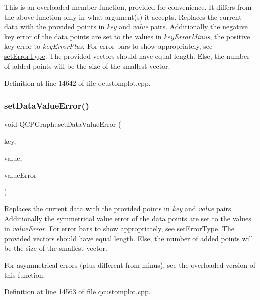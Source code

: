 This is an overloaded member function, provided for convenience. It differs from the above function only in what argument(s) it accepts. Replaces the current data with the provided points in {\itshape key} and {\itshape value} pairs. Additionally the negative key error of the data points are set to the values in {\itshape key\+Error\+Minus}, the positive key error to {\itshape key\+Error\+Plus}. For error bars to show appropriately, see \hyperlink{class_q_c_p_graph_ac3614d799c3894f2bc646e99c7f73d38}{set\+Error\+Type}. The provided vectors should have equal length. Else, the number of added points will be the size of the smallest vector. 

Definition at line 14642 of file qcustomplot.\+cpp.

\mbox{\label{class_q_c_p_graph_acba6296eadcb36b93267628b8dae3de5}} 
\subsubsection{\texorpdfstring{set\+Data\+Value\+Error()}{setDataValueError()}\hspace{0.1cm}{\footnotesize\ttfamily [1/2]}}
{\footnotesize\ttfamily void Q\+C\+P\+Graph\+::set\+Data\+Value\+Error (\begin{DoxyParamCaption}\item[{const Q\+Vector$<$ double $>$ \&}]{key,  }\item[{const Q\+Vector$<$ double $>$ \&}]{value,  }\item[{const Q\+Vector$<$ double $>$ \&}]{value\+Error }\end{DoxyParamCaption})}

Replaces the current data with the provided points in {\itshape key} and {\itshape value} pairs. Additionally the symmetrical value error of the data points are set to the values in {\itshape value\+Error}. For error bars to show appropriately, see \hyperlink{class_q_c_p_graph_ac3614d799c3894f2bc646e99c7f73d38}{set\+Error\+Type}. The provided vectors should have equal length. Else, the number of added points will be the size of the smallest vector.

For asymmetrical errors (plus different from minus), see the overloaded version of this function. 

Definition at line 14563 of file qcustomplot.\+cpp.

